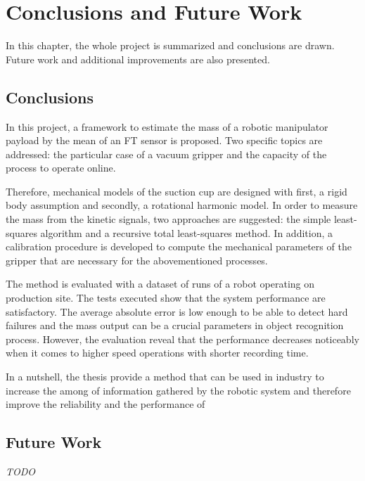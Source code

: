 \documentclass[/home/francois/latex/report/main.tex]{subfiles}
\begin{document}
\chapter{Conclusions and Future Work}
\label{chapter:conclusions}

In this chapter, the whole project is summarized and conclusions are drawn. Future work and additional improvements are also presented.

\section{Conclusions}

In this project, a framework to estimate the mass of a robotic manipulator payload by the mean of an \ac{FT} sensor is proposed. Two specific topics are addressed: the particular case of a vacuum gripper and the capacity of the process to operate online.

Therefore, mechanical models of the suction cup are designed with first, a rigid body assumption and secondly, a rotational harmonic model. In order to measure the mass from the kinetic signals, two approaches are suggested: the simple least-squares algorithm and a recursive total least-squares method. In addition, a calibration procedure is developed to compute the mechanical parameters of the gripper that are necessary for the abovementioned processes.

The method is evaluated with a dataset of runs of a robot operating on production site. The tests executed show that the system performance are satisfactory. The average absolute error is low enough to be able to detect hard failures and the mass output can be a crucial parameters in object recognition process. However, the evaluation reveal that the performance decreases noticeably when it comes to higher speed operations with shorter recording time.

In a nutshell, the thesis provide a method that can be used in industry to increase the among of information gathered by the robotic system and therefore improve the reliability and the performance of

\section{Future Work}

\textit{TODO}
\end{document}
